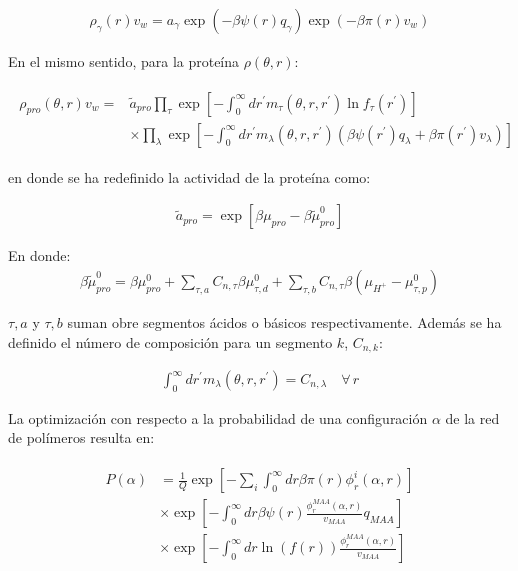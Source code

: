 \begin{align}
	\rho_\gamma(r)v_w = a_\gamma \exp{\left(-\beta \psi(r)q_\gamma\right)} \exp{\left(-\beta\pi(r) v_w\right)}
\end{align}


En el mismo sentido, para la prote\'ina $\rho(\theta,r)$:
	
	

\begin{align}
	\begin{aligned}
		\rho_{pro}(\theta, r)v_w = & \tilde{a}_{pro} \prod_\tau \exp\left[ -\int_0^\infty dr^\prime  m_\tau(\theta,r,r^\prime) \ln f_\tau(r^\prime)\right] \\
		& \times \prod_\lambda \exp\left[ -\int_0^\infty dr^\prime  m_\lambda(\theta,r,r^\prime)\left( \beta\psi(r^\prime) q_\lambda + \beta \pi(r^\prime) v_\lambda \right)\right]
	\end{aligned}
	\label{eq:esf:rho-pro}
\end{align}
	
	\noindent en donde se ha redefinido la actividad de la prote\'ina como:
	
	\begin{align}
		\tilde{a}_{pro} = \exp[\beta\mu_{pro} - \beta\tilde{\mu}^0_{pro}]
	\end{align}
	
		
En donde:
\begin{align}
	\beta\tilde{\mu}^0_{pro} =  \beta \mu^0_{pro}  + \sum_{\tau,a} C_{n,\tau}\beta\mu^0_{\tau,d} 
	+ \sum_{\tau,b} C_{n,\tau}\beta(\mu_{H^+} - \mu^0_{\tau,p})
\end{align}


\noindent $\tau,a$ y  $\tau,b$ suman obre segmentos \'acidos o b\'asicos respectivamente. Adem\'as se ha definido el n\'umero de composici\'on para un segmento $k$, $C_{n,k}$:

	\begin{align}
		\int_0^\infty dr^\prime  m_\lambda(\theta,r,r^\prime) = C_{n,\lambda}\quad \forall \, r
		\label{eq:esf:composition}
	\end{align}

La optimizaci\'on con respecto a la probabilidad de una configuraci\'on $\alpha$ de la red de pol\'imeros resulta en:


\begin{align}
	\begin{aligned}
		P(\alpha)&=\frac{1}{Q}\exp\left[- \sum_i{\int_0^\infty{dr\beta\pi(r)\phi^i_r(\alpha,r)}}\right] \\
		& \times \exp \left[ -\int_0^\infty dr \beta \psi(r)\frac{\phi^{MAA}_r(\alpha,r)}{v_{MAA}} q_{MAA}  \right] \\
		& \times \exp\left[ -\int_0^\infty{ dr\ln(f(r))\frac{\phi^{MAA}_r(\alpha,r)}{v_{MAA}}}\right] \\
	\end{aligned}
	\label{eq:esf:proba-alfa}
\end{align}

